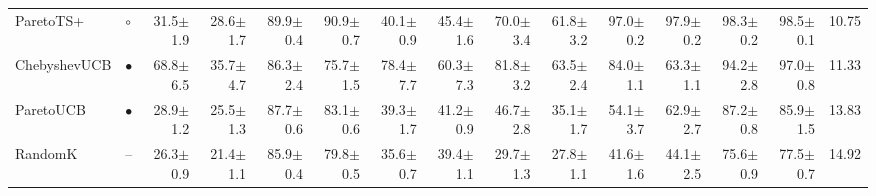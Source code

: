 \begin{tabular}{llrrrrrrrrrrrrr}
ParetoTS+ & $\circ$ & 31.5{\scriptsize$\pm$1.9} & 28.6{\scriptsize$\pm$1.7} & 89.9{\scriptsize$\pm$0.4} & 90.9{\scriptsize$\pm$0.7} & 40.1{\scriptsize$\pm$0.9} & 45.4{\scriptsize$\pm$1.6} & 70.0{\scriptsize$\pm$3.4} & 61.8{\scriptsize$\pm$3.2} & 97.0{\scriptsize$\pm$0.2} & 97.9{\scriptsize$\pm$0.2} & 98.3{\scriptsize$\pm$0.2} & 98.5{\scriptsize$\pm$0.1} & 10.75\\
ChebyshevUCB & $\bullet$ & 68.8{\scriptsize$\pm$6.5} & 35.7{\scriptsize$\pm$4.7} & 86.3{\scriptsize$\pm$2.4} & 75.7{\scriptsize$\pm$1.5} & 78.4{\scriptsize$\pm$7.7} & 60.3{\scriptsize$\pm$7.3} & 81.8{\scriptsize$\pm$3.2} & 63.5{\scriptsize$\pm$2.4} & 84.0{\scriptsize$\pm$1.1} & 63.3{\scriptsize$\pm$1.1} & 94.2{\scriptsize$\pm$2.8} & 97.0{\scriptsize$\pm$0.8} & 11.33\\
ParetoUCB & $\bullet$ & 28.9{\scriptsize$\pm$1.2} & 25.5{\scriptsize$\pm$1.3} & 87.7{\scriptsize$\pm$0.6} & 83.1{\scriptsize$\pm$0.6} & 39.3{\scriptsize$\pm$1.7} & 41.2{\scriptsize$\pm$0.9} & 46.7{\scriptsize$\pm$2.8} & 35.1{\scriptsize$\pm$1.7} & 54.1{\scriptsize$\pm$3.7} & 62.9{\scriptsize$\pm$2.7} & 87.2{\scriptsize$\pm$0.8} & 85.9{\scriptsize$\pm$1.5} & 13.83\\
RandomK & -- & 26.3{\scriptsize$\pm$0.9} & 21.4{\scriptsize$\pm$1.1} & 85.9{\scriptsize$\pm$0.4} & 79.8{\scriptsize$\pm$0.5} & 35.6{\scriptsize$\pm$0.7} & 39.4{\scriptsize$\pm$1.1} & 29.7{\scriptsize$\pm$1.3} & 27.8{\scriptsize$\pm$1.1} & 41.6{\scriptsize$\pm$1.6} & 44.1{\scriptsize$\pm$2.5} & 75.6{\scriptsize$\pm$0.9} & 77.5{\scriptsize$\pm$0.7} & 14.92\\
\bottomrule
\end{tabular}
